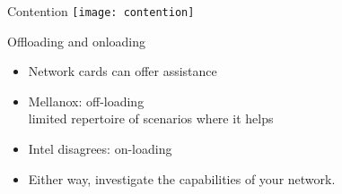 \begin{frame}{Contention}
  \texttt{[image: contention]}
\end{frame}

\begin{frame}[containsverbatim]{Offloading and onloading}

  \begin{itemize}
  \item Network cards can offer assistance
  \item Mellanox: off-loading\\
    limited repertoire of scenarios where it helps
  \item Intel disagrees: on-loading
  \item Either way, investigate the capabilities of your network.
  \end{itemize}
\end{frame}

